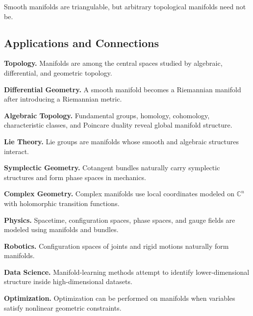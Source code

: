 Smooth manifolds are triangulable, but arbitrary topological manifolds need
not be.

\subsection{Applications and Connections}
\label{subsec:manifolds-applications}

\begin{applicationbox}
\textbf{Topology.}
Manifolds are among the central spaces studied by algebraic, differential,
and geometric topology.

\medskip

\textbf{Differential Geometry.}
A smooth manifold becomes a Riemannian manifold after introducing a
Riemannian metric.

\medskip

\textbf{Algebraic Topology.}
Fundamental groups, homology, cohomology, characteristic classes, and
Poincare duality reveal global manifold structure.

\medskip

\textbf{Lie Theory.}
Lie groups are manifolds whose smooth and algebraic structures interact.

\medskip

\textbf{Symplectic Geometry.}
Cotangent bundles naturally carry symplectic structures and form phase
spaces in mechanics.

\medskip

\textbf{Complex Geometry.}
Complex manifolds use local coordinates modeled on \(\mathbb{C}^n\) with
holomorphic transition functions.

\medskip

\textbf{Physics.}
Spacetime, configuration spaces, phase spaces, and gauge fields are modeled
using manifolds and bundles.

\medskip

\textbf{Robotics.}
Configuration spaces of joints and rigid motions naturally form manifolds.

\medskip

\textbf{Data Science.}
Manifold-learning methods attempt to identify lower-dimensional structure
inside high-dimensional datasets.

\medskip

\textbf{Optimization.}
Optimization can be performed on manifolds when variables satisfy nonlinear
geometric constraints.
\end{applicationbox}

